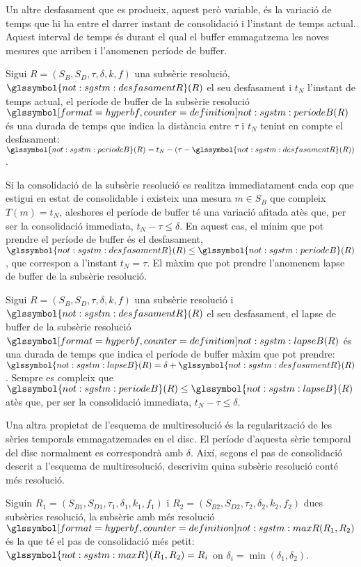 Un altre desfasament que es produeix, aquest però variable, és la
variació de temps que hi ha entre el darrer instant de consolidació i
l'instant de temps actual. Aquest interval de temps és durant el qual
el buffer emmagatzema les noves mesures que arriben i l'anomenen
període de buffer.
\begin{definition}
  Sigui $R=(S_B,S_D,\tau,\delta,k,f)$ una subsèrie resolució,
  $\glssymbol{not:sgstm:desfasamentR}(R)$ el seu desfasament i $t_N$
  l'instant de temps actual, el període de buffer de la subsèrie
  resolució $\glssymboldef{not:sgstm:periodeB}(R)$ és una durada de
  temps que indica la distància entre $\tau$ i $t_N$ tenint en compte
  el desfasament: $\glssymbol{not:sgstm:periodeB}(R) = t_N - (\tau -
  \glssymbol{not:sgstm:desfasamentR}(R))$.
\end{definition}

Si la consolidació de la subsèrie resolució es realitza immediatament
cada cop que estigui en estat de consolidable i existeix una mesura
$m\in S_B$ que compleix $T(m)=t_N$, aleshores el període de buffer té
una variació afitada atès que, per ser la consolidació immediata, $t_N
- \tau \leq \delta$. En aquest cas, el mínim que pot prendre el
període de buffer és el desfasament,
$\glssymbol{not:sgstm:desfasamentR}(R)\leq
\glssymbol{not:sgstm:periodeB}(R)$, que correspon a l'instant
$t_N=\tau$. El màxim que pot prendre l'anomenem lapse de buffer de la
subsèrie resolució.
\begin{definition}
  Sigui $R=(S_B,S_D,\tau,\delta,k,f)$ una subsèrie resolució i
  $\glssymbol{not:sgstm:desfasamentR}(R)$ el seu desfasament, el lapse
  de buffer de la subsèrie resolució
  $\glssymboldef{not:sgstm:lapseB}(R)$ és una durada de temps que
  indica el període de buffer màxim que pot prendre:
  $\glssymbol{not:sgstm:lapseB}(R) = \delta +
  \glssymbol{not:sgstm:desfasamentR}(R)$.  Sempre es compleix que
  $\glssymbol{not:sgstm:periodeB}(R) \leq
  \glssymbol{not:sgstm:lapseB}(R)$ atès que, per ser la consolidació
  immediata, $t_N - \tau \leq \delta$.
\end{definition}


Una altra propietat de l'esquema de multiresolució és la
regularització de les sèries temporals emmagatzemades en el disc. El
període d'aquesta sèrie temporal del disc normalment es correspondrà
amb $\delta$.  Així, segons el pas de consolidació descrit a
l'esquema de multiresolució, descrivim quina subsèrie resolució conté
més resolució.
\begin{definition}
  Siguin $R_1=(S_{B1},S_{D1},\tau_1,\delta_1,k_1,f_1)$ i
  $R_2=(S_{B2},S_{D2},\tau_2,\delta_2,k_2,f_2)$ dues subsèries
  resolució, la subsèrie amb més resolució
  $\glssymboldef{not:sgstm:maxR}(R_1,R_2)$ és la que té el pas de
  consolidació més petit: $\glssymbol{not:sgstm:maxR}(R_1,R_2) = R_i$
  on $\delta_i = \min(\delta_1,\delta_2)$.
\end{definition}


